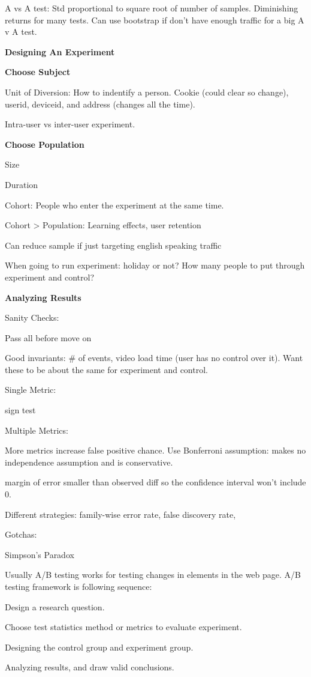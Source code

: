 \documentclass[]{book}
\theoremstyle{definition}
\theoremstyle{definition}
\theoremstyle{definition}
\theoremstyle{remark}
\begin{document}
A vs A test: Std proportional to square root of number of samples.
Diminishing returns for many tests. Can use bootstrap if don't have
enough traffic for a big A v A test.

\textbf{Designing An Experiment}

\textbf{Choose Subject}

Unit of Diversion: How to indentify a person. Cookie (could clear so
change), userid, deviceid, and address (changes all the time).

Intra-user vs inter-user experiment.

\textbf{Choose Population}

Size

Duration

Cohort: People who enter the experiment at the same time.

Cohort \textgreater{} Population: Learning effects, user retention

Can reduce sample if just targeting english speaking traffic

When going to run experiment: holiday or not? How many people to put
through experiment and control?

\textbf{Analyzing Results}

Sanity Checks:

Pass all before move on

Good invariants: \# of events, video load time (user has no control over
it). Want these to be about the same for experiment and control.

Single Metric:

sign test

Multiple Metrics:

More metrics increase false positive chance. Use Bonferroni assumption:
makes no independence assumption and is conservative.

margin of error smaller than observed diff so the confidence interval
won't include 0.

Different strategies: family-wise error rate, false discovery rate,

Gotchas:

Simpson's Paradox

Usually A/B testing works for testing changes in elements in the web
page. A/B testing framework is following sequence:

Design a research question.

Choose test statistics method or metrics to evaluate experiment.

Designing the control group and experiment group.

Analyzing results, and draw valid conclusions.


\end{document}
